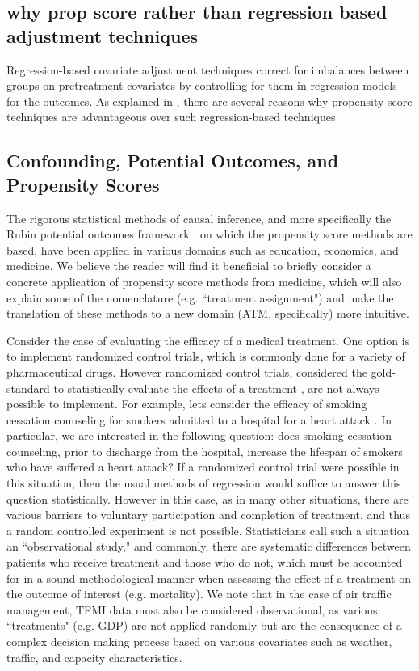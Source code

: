 \documentclass[11pt]{scrartcl}
\begin{document}
\subsection*{why prop score rather than regression based adjustment techniques}

Regression-based covariate adjustment techniques correct for imbalances between groups on pretreatment covariates by controlling for them in regression models for the outcomes.  As explained in  \cite{mccaffrey2013tutorial}, there are several reasons why propensity score techniques are advantageous over such regression-based techniques






\subsection*{Confounding, Potential Outcomes, and Propensity Scores}
The rigorous statistical methods of causal inference, and more specifically the Rubin potential outcomes framework \cite{rubin1974estimating}, on which the propensity score methods are based, have been applied in various domains such as education, economics, and medicine.  We believe the reader will find it beneficial to briefly consider a concrete application of propensity score methods from medicine, which will also explain some of the nomenclature (e.g. ``treatment assignment") and make the translation of these methods to a new domain (ATM, specifically) more intuitive.  

Consider the case of evaluating the efficacy of a medical treatment.  One option is to implement randomized control trials, which is commonly done for a variety of pharmaceutical drugs.  However randomized control trials, considered the gold-standard to statistically evaluate the effects of a treatment \cite{austin2011introduction}, are not always possible to implement.  For example, lets consider the efficacy of smoking cessation counseling for smokers admitted to a hospital for a heart attack \cite{austin2011tutorial}.  In particular, we are interested in the following question: does smoking cessation counseling, prior to discharge from the hospital, increase the lifespan of smokers who have suffered a heart attack?  If a randomized control trial were possible in this situation, then the usual methods of regression would suffice to answer this question statistically.  However in this case, as in many other situations, there are various barriers to voluntary participation and completion of treatment, and thus a random controlled experiment is not possible.  Statisticians call such a situation an ``observational study," and commonly, there are systematic differences between patients who receive treatment and those who do not, which must be accounted for in a sound methodological manner when assessing the effect of a treatment on the outcome of interest (e.g. mortality).  We note that in the case of air traffic management, TFMI data must also be considered observational, as various ``treatments" (e.g. GDP) are not applied randomly but are the consequence of a complex decision making process based on various covariates such as weather, traffic, and capacity characteristics.  
\end{document}
